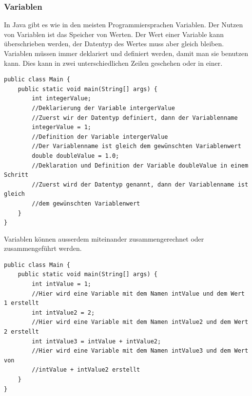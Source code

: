 \subsubsection{Variablen}
In Java gibt es wie in den meisten Programmiersprachen Variablen. Der Nutzen von Variablen ist das Speicher von Werten. Der Wert einer Variable kann überschrieben werden, der Datentyp des Wertes muss aber gleich bleiben. Variablen müssen immer deklariert und definiert werden, damit man sie benutzen kann. Dies kann in zwei unterschiedlichen Zeilen geschehen oder in einer.
\begin{verbatim}
public class Main {
    public static void main(String[] args) {
        int integerValue;
        //Deklarierung der Variable intergerValue
        //Zuerst wir der Datentyp definiert, dann der Variablenname
        integerValue = 1;
        //Definition der Variable intergerValue
        //Der Variablenname ist gleich dem gewünschten Variablenwert
        double doubleValue = 1.0;
        //Deklaration und Definition der Variable doubleValue in einem Schritt
        //Zuerst wird der Datentyp genannt, dann der Variablenname ist gleich 
        //dem gewünschten Variablenwert
    }
}
\end{verbatim}
Variablen können ausserdem miteinander zusammengerechnet oder zusammengeführt werden\cite{programmieren_lernen_java_2021}.
\begin{verbatim}
public class Main {
    public static void main(String[] args) {
        int intValue = 1;
        //Hier wird eine Variable mit dem Namen intValue und dem Wert 1 erstellt
        int intValue2 = 2;
        //Hier wird eine Variable mit dem Namen intValue2 und dem Wert 2 erstellt
        int intValue3 = intValue + intValue2;
        //Hier wird eine Variable mit dem Namen intValue3 und dem Wert von 
        //intValue + intValue2 erstellt
    }
}
\end{verbatim}

